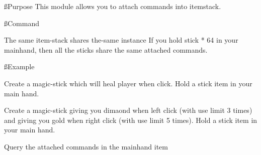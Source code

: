
\ss{Purpose}
This module allows you to attach commands into itemstack.

\ss{Command}

\begin{note}{The same item-stack shares the-same instance}
    If you hold stick * 64 in your mainhand, then all the sticks share the same attached commands.
\end{note}

\ss{Example}
\begin{example}{Create a magic-stick which will heal player when click.}
    Hold a stick item in your main hand.\\
\end{example}

\begin{example}{Create a magic-stick giving you dimaond when left click (with use limit 3 times) and giving you gold when right click (with use limit 5 times).}
    Hold a stick item in your main hand.


\end{example}

\begin{example}{Query the attached commands in the mainhand item}
\end{example}
